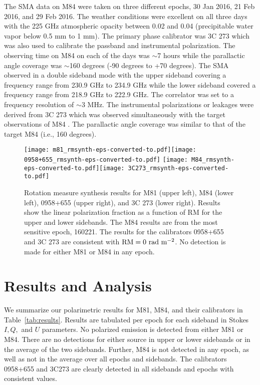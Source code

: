 \documentclass[12pt,preprint]{aastex}
\begin{document}
The SMA data on M84 were taken on three different epochs, 30 Jan 2016, 21 Feb 2016, and 29 Feb 2016. The weather conditions were excellent on all three days with the 225 GHz atmospheric opacity between 0.02 and 0.04 (precipitable water vapor below 0.5 mm to 1 mm). The primary phase calibrator was 3C 273 which was also used to calibrate the passband and instrumental polarization. The observing time on M84 on each of the days was $\sim$7 hours while the parallactic angle coverage was $\sim$160 degrees (-90 degrees to +70 degrees). The SMA observed in a double sideband mode with the upper sideband covering a frequency range from 230.9 GHz to 234.9 GHz while the lower sideband covered a frequency range from 218.9 GHz to 222.9 GHz. The correlator was set to a frequency resolution of $\sim$3 MHz. The instrumental polarizations or leakages were derived from 3C 273 which was observed simultaneously with the target observations of M84 \citep{2008SPIE.7020E..2BM}. The parallactic angle coverage was  similar to that of the target M84 (i.e., 160 degrees). 

\begin{figure}[p!]
\texttt{[image: m81\_rmsynth-eps-converted-to.pdf]}\texttt{[image: 0958+655\_rmsynth-eps-converted-to.pdf]}
\texttt{[image: M84\_rmsynth-eps-converted-to.pdf]}\texttt{[image: 3C273\_rmsynth-eps-converted-to.pdf]}
\caption{Rotation measure synthesis results for M81 (upper left), M84 (lower left), 0958+655 (upper right), and 3C 273 (lower right).  Results show the linear polarization fraction as a function
of RM for the upper and lower sidebands.  The M84 results are from the most sensitive epoch, 160221.
The results for the calibrators 0958+655 and 3C 273
are consistent with ${\rm RM}=0 {\rm\ rad\ m^{-2}}$.  No detection is made for either M81 or M84 in any epoch.
\label{fig:rmspectra}
}
\end{figure}

\section{Results and Analysis}

We summarize our polarimetric results for M81, M84, and their calibrators in Table~\ref{tab:results}.
Results are tabulated per epoch for each sideband in Stokes $I, Q,$ and $U$ parameters.
No polarized emission is detected from either M81 or M84.  There are no detections 
for either source in upper or lower sidebands or in the average of the two sidebands.
Further, M84 is not detected in any epoch, as well as not in the
average over all epochs and sidebands.  The calibrators 0958+655 and 3C273 are clearly detected
in all sidebands and epochs with consistent values.
\end{document}
